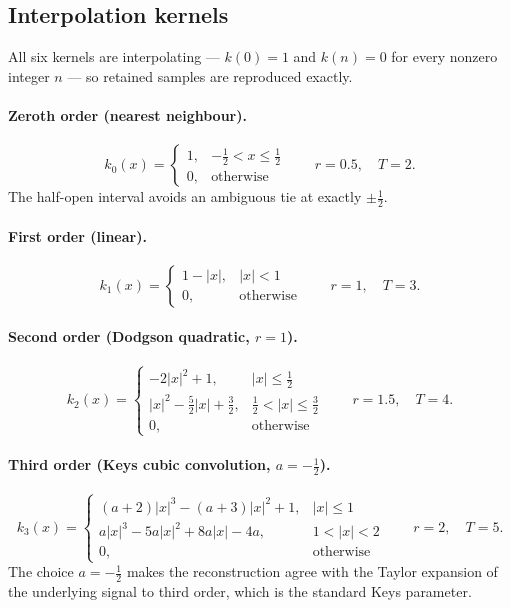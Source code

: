 \documentclass[11pt,a4paper]{article}
\begin{document}
\subsection{Interpolation kernels}

All six kernels are interpolating --- $k(0)=1$ and $k(n)=0$ for every nonzero integer $n$ ---
so retained samples are reproduced exactly.

\paragraph{Zeroth order (nearest neighbour).}
\begin{equation}
k_{0}(x) = \begin{cases} 1, & -\tfrac{1}{2} < x \le \tfrac{1}{2} \\[2pt] 0, &
\text{otherwise} \end{cases}
\qquad r = 0.5,\quad T = 2.
\label{eq:k0}
\end{equation}
The half-open interval avoids an ambiguous tie at exactly $\pm\tfrac12$.

\paragraph{First order (linear).}
\begin{equation}
k_{1}(x) = \begin{cases} 1 - |x|, & |x| < 1 \\[2pt] 0, & \text{otherwise} \end{cases}
\qquad r = 1,\quad T = 3.
\label{eq:k1}
\end{equation}

\paragraph{Second order (Dodgson quadratic, $r=1$).}
\begin{equation}
k_{2}(x) = \begin{cases}
-2|x|^{2} + 1, & |x| \le \tfrac{1}{2} \\[3pt]
|x|^{2} - \tfrac{5}{2}|x| + \tfrac{3}{2}, & \tfrac{1}{2} < |x| \le \tfrac{3}{2} \\[3pt]
0, & \text{otherwise}
\end{cases}
\qquad r = 1.5,\quad T = 4.
\label{eq:k2}
\end{equation}

\paragraph{Third order (Keys cubic convolution, $a = -\tfrac{1}{2}$).}
\begin{equation}
k_{3}(x) = \begin{cases}
(a+2)|x|^{3} - (a+3)|x|^{2} + 1, & |x| \le 1 \\[3pt]
a|x|^{3} - 5a|x|^{2} + 8a|x| - 4a, & 1 < |x| < 2 \\[3pt]
0, & \text{otherwise}
\end{cases}
\qquad r = 2,\quad T = 5.
\label{eq:k3}
\end{equation}
The choice $a = -\tfrac{1}{2}$ makes the reconstruction agree with the Taylor expansion of the
underlying signal to third order, which is the standard Keys parameter.
\end{document}
